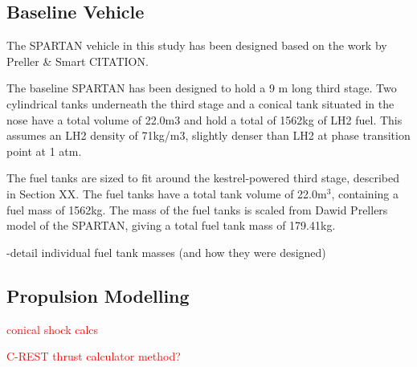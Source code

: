 		\subsection{Baseline Vehicle}
		The SPARTAN vehicle in this study has been designed based on the work by Preller \& Smart CITATION. 
		
		The baseline SPARTAN has been designed to hold a 9 m long third stage.  Two cylindrical tanks underneath the third stage and a conical tank situated in the nose have a total volume of 22.0m3 and hold a total of 1562kg of LH2 fuel. This assumes an LH2 density of 71kg/m3, slightly denser than LH2 at phase transition point at 1 atm.
		
		
		
		The fuel tanks are sized to fit around the kestrel-powered third stage, described in Section XX. 
The fuel tanks have a total tank volume of 22.0m$^3$, containing a fuel mass of 1562kg.
The mass of the fuel tanks is scaled from Dawid Prellers model of the SPARTAN, giving a total fuel tank mass of 179.41kg.
		
		-detail individual fuel tank masses (and how they were designed)




\subsection{Propulsion Modelling}

\textcolor{red}{conical shock calcs}

\textcolor{red}{C-REST thrust calculator method?}


